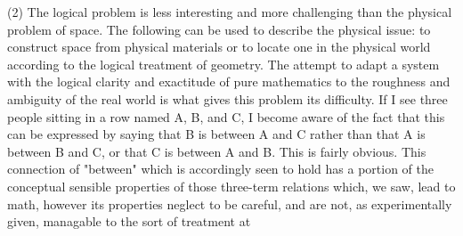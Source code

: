 \documentclass[a4paper,12pt]{book}[2004/02/16]
\theoremstyle{ilemma}
\theoremstyle{itheorem}
\theoremstyle{iother}
\theoremstyle{icorollary}
\theoremstyle{numcorollary}
\theoremstyle{idefinition}
\begin{document}
(2) The logical problem is less interesting and more challenging than the physical problem of space. The following can be used to describe the physical issue: to construct space from physical materials or to locate one in the physical world according to the logical treatment of geometry. The attempt to adapt a system with the logical clarity and exactitude of pure mathematics to the roughness and ambiguity of the real world is what gives this problem its difficulty. If I see three people sitting in a row named A, B, and C, I become aware of the fact that this can be expressed by saying that B is between A and C rather than that A is between B and C, or that C is between A and B. This is fairly obvious. This
connection of "between" which is accordingly seen to hold has a portion of the
conceptual sensible properties of those three-term relations which, we
saw, lead to math, however its properties neglect to be careful, and
are not, as experimentally given, managable to the sort of treatment at
\end{document}
